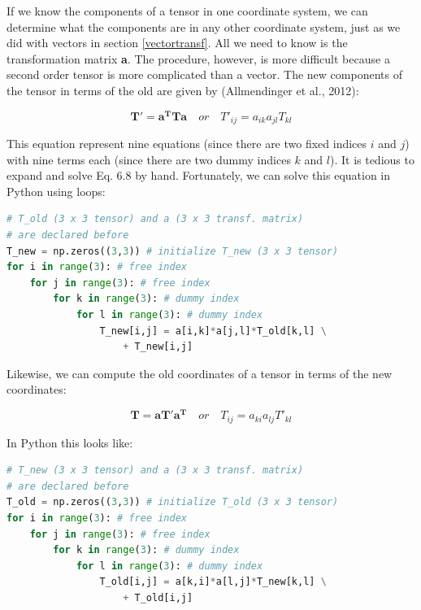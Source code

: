 \documentclass[a4paper , 12pt]{book}
\begin{document}
If we know the components of a tensor in one coordinate system, we can determine what the components are in any other coordinate system, just as we did with vectors in section \ref{vectortransf}. All we need to know is the transformation matrix \textbf{a}. The procedure, however, is more difficult because a second order tensor is more complicated than a vector. The new components of the tensor in terms of the old are given by (Allmendinger et al., 2012):

\begin{equation}
    \mathbf{T'}=\mathbf{a}^{\mathbf{T}}\mathbf{T}\mathbf{a}\quad or\quad T'_{ij}=a_{ik}a_{jl}T_{kl}
\end{equation}

This equation represent nine equations (since there are two fixed indices $i$ and $j$) with nine terms each (since there are two dummy indices $k$ and $l$). It is tedious to expand and solve Eq. 6.8 by hand. Fortunately, we can solve this equation in Python using loops:

\begin{center}
\begin{lstlisting}[language=Python, frame=single]
# T_old (3 x 3 tensor) and a (3 x 3 transf. matrix) 
# are declared before
T_new = np.zeros((3,3)) # initialize T_new (3 x 3 tensor)
for i in range(3): # free index
    for j in range(3): # free index
        for k in range(3): # dummy index
            for l in range(3): # dummy index
                T_new[i,j] = a[i,k]*a[j,l]*T_old[k,l] \
                    + T_new[i,j]
\end{lstlisting}
\end{center}

Likewise, we can compute the old coordinates of a tensor in terms of the new coordinates:

\begin{equation}
    \mathbf{T}=\mathbf{a}\mathbf{T'}\mathbf{a}^{\mathbf{T}}\quad or\quad T_{ij}=a_{ki}a_{lj}T'_{kl}
\end{equation}

In Python this looks like:

\begin{center}
\begin{lstlisting}[language=Python, frame=single]
# T_new (3 x 3 tensor) and a (3 x 3 transf. matrix) 
# are declared before
T_old = np.zeros((3,3)) # initialize T_old (3 x 3 tensor)
for i in range(3): # free index
    for j in range(3): # free index
        for k in range(3): # dummy index
            for l in range(3): # dummy index
                T_old[i,j] = a[k,i]*a[l,j]*T_new[k,l] \
                    + T_old[i,j]
\end{lstlisting}
\end{center}
\end{document}
